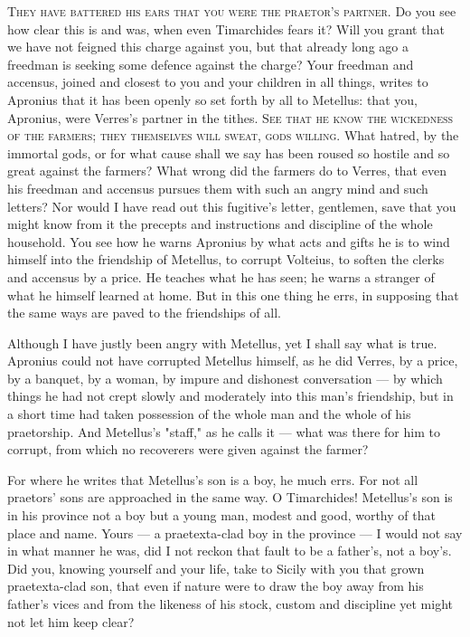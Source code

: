  \textsc{They have battered his ears that you were the praetor's partner}. Do you see how clear this is and was, when even Timarchides fears it? Will you grant that we have not feigned this charge against you, but that already long ago a freedman is seeking some defence against the charge? Your freedman and accensus, joined and closest to you and your children in all things, writes to Apronius that it has been openly so set forth by all to Metellus: that you, Apronius, were Verres's partner in the tithes. \textsc{See that he know the wickedness of the farmers; they themselves will sweat, gods willing}. What hatred, by the immortal gods, or for what cause shall we say has been roused so hostile and so great against the farmers? What wrong did the farmers do to Verres, that even his freedman and accensus pursues them with such an angry mind and such letters? Nor would I have read out this fugitive's letter, gentlemen, save that you might know from it the precepts and instructions and discipline of the whole household. You see how he warns Apronius by what acts and gifts he is to wind himself into the friendship of Metellus, to corrupt Volteius, to soften the clerks and accensus by a price. He teaches what he has seen; he warns a stranger of what he himself learned at home. But in this one thing he errs, in supposing that the same ways are paved to the friendships of all.

 Although I have justly been angry with Metellus, yet I shall say what is true. Apronius could not have corrupted Metellus himself, as he did Verres, by a price, by a banquet, by a woman, by impure and dishonest conversation --- by which things he had not crept slowly and moderately into this man's friendship, but in a short time had taken possession of the whole man and the whole of his praetorship. And Metellus's "staff," as he calls it --- what was there for him to corrupt, from which no recoverers were given against the farmer?

 For where he writes that Metellus's son is a boy, he much errs. For not all praetors' sons are approached in the same way. O Timarchides! Metellus's son is in his province not a boy but a young man, modest and good, worthy of that place and name. Yours --- a praetexta-clad boy in the province --- I would not say in what manner he was, did I not reckon that fault to be a father's, not a boy's. Did you, knowing yourself and your life, take to Sicily with you that grown praetexta-clad son, that even if nature were to draw the boy away from his father's vices and from the likeness of his stock, custom and discipline yet might not let him keep clear?

